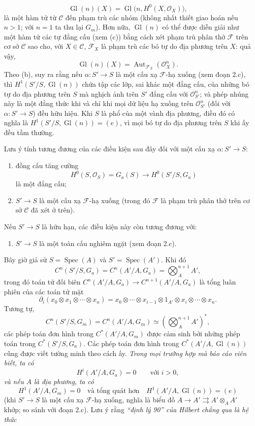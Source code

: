 \[
  \operatorname{Gl}(n)(X)=
  \operatorname{Gl}\bigl(n,H^0(X,\mathcal O_X)\bigr),
\]
là một hàm tử từ $\mathcal C$ đến phạm trù các nhóm (không nhất thiết giao
hoán nếu $n>1$; với $n=1$ ta thu lại $G_m$). Hơn nữa,
$\operatorname{Gl}(n)$ có thể được diễn giải như một hàm tử các tự đẳng cấu (xem
(c)) bằng cách xét phạm trù phân thớ $\mathcal F$ trên cơ sở $\mathcal C$ sao
cho, với $X\in\mathcal C$, $\mathcal F_X$ là phạm trù các bó tự do địa phương
trên $X$: quả vậy,
\[
  \operatorname{Gl}(n)(X)=
  \operatorname{Aut}_{\mathcal F_X}(\mathcal O_X^n).
\]
Theo (b), suy ra rằng nếu $\alpha:S'\longrightarrow S$ là một cấu xạ
$\mathcal F$-hạ xuống (xem đoạn 2.c), thì
$H^1(S'/S,\operatorname{Gl}(n))$ chứa tập các lớp, sai khác một đẳng cấu, của
những bó tự do địa phương trên $S$ mà nghịch ảnh trên $S'$ đẳng cấu với
$\mathcal O_{S'}^n$; và phép nhúng này là một đẳng thức khi và chỉ khi mọi dữ
liệu hạ xuống trên $\mathcal O_{S'}^n$ (đối với
$\alpha:S'\longrightarrow S$) đều hữu hiệu. Khi $S$ là phổ của một vành địa
phương, điều đó có nghĩa là
$H^1(S'/S,\operatorname{Gl}(n))=(e)$, vì mọi bó tự do địa phương trên $S$ khi
ấy đều tầm thường.

Lưu ý tính tương đương của các điều kiện sau đây đối với một cấu xạ
$\alpha:S'\longrightarrow S$:
\begin{enumerate}
\item[(i)] đồng cấu tăng cường
\[
  H^0(S,\mathcal O_S)=G_a(S)\longrightarrow H^0(S'/S,G_a)
\]
là một đẳng cấu;
\item[(ii)] $S'\longrightarrow S$ là một cấu xạ $\mathcal F$-hạ xuống
(trong đó $\mathcal F$ là phạm trù phân thớ trên cơ sở $\mathcal C$ đã xét ở
trên).
\end{enumerate}
Nếu $S'\longrightarrow S$ là hữu hạn, các điều kiện này còn tương đương với:
\begin{enumerate}
\item[(iii)] $S'\longrightarrow S$ là một toàn cấu nghiêm ngặt
(xem đoạn 2.c).
\end{enumerate}

Bây giờ giả sử $S=\operatorname{Spec}(A)$ và
$S'=\operatorname{Spec}(A')$. Khi đó
\[
  C^n(S'/S,G_a)=C^n(A'/A,G_a)=\bigotimes_A^{n+1}A',
\]
trong đó toán tử đối biên
$C^n(A'/A,G_a)\longrightarrow C^{n+1}(A'/A,G_a)$ là tổng luân phiên của các
toán tử mặt
\[
  \partial_i(x_0\otimes x_1\otimes\cdots\otimes x_n)
  =x_0\otimes\cdots\otimes x_{i-1}\otimes1_{A'}\otimes
   x_i\otimes\cdots\otimes x_n.
\]
Tương tự,
\[
  C^n(S'/S,G_m)=C^n(A'/A,G_m)
  \simeq\left(\bigotimes_A^{n+1}A'\right)^*,
\]
các phép toán đơn hình trong $C^*(A'/A,G_m)$ được cảm sinh bởi những phép toán
trong $C^*(S'/S,G_a)$. Các phép toán đơn hình trong
$C^*(A'/A,\operatorname{Gl}(n))$ cũng được viết tường minh theo cách ấy.
\emph{Trong mọi trường hợp mà báo cáo viên biết, ta có}
\[
  H^i(A'/A,G_a)=0\qquad\text{với $i>0$},
\]
\emph{và nếu $A$ là địa phương, ta có}
\[
  H^1(A'/A,G_m)=0
  \quad\text{và tổng quát hơn}\quad
  H^1(A'/A,\operatorname{Gl}(n))=(e)
\]
(khi $S'\longrightarrow S$ là một cấu xạ $\mathcal F$-hạ xuống, nghĩa là biểu
đồ
$A\longrightarrow A'\rightrightarrows A'\otimes_AA'$ khớp; so sánh với đoạn
2.c). Lưu ý rằng \emph{“định lý 90” của Hilbert chẳng qua là hệ thức}

